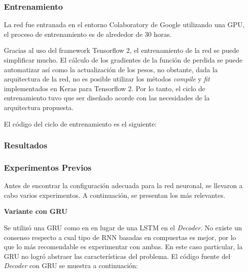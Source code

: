 



\subsubsection{Entrenamiento}

La red fue entranada en el entorno Colaboratory de Google utilizando una GPU, el proceso de entrenamiento es de alrededor de 30 horas.

Gracias al uso del framework Tensorflow 2, el entrenamiento de la red se puede simplificar mucho. El cálculo de los gradientes de la función de perdida se puede automatizar así como la actualización de los pesos, no obstante, dada la arquitectura de la red, no es posible utilizar los métodos \textit{compile} y \textit{fit} implementados en Keras para Tensorflow 2. Por lo tanto, el ciclo de entrenamiento tuvo que ser diseñado acorde con las necesidades de la arquitectura propuesta.

El código del ciclo de entrenamiento es el siguiente:



\subsubsection{Resultados}

\subsubsection{Experimentos Previos}

Antes de encontrar la configuración adecuada para la red neuronal, se llevaron a cabo varios experimentos. A continuación, se presentan los más relevantes.

\vspace{1em}
\textbf{Variante con GRU}
\vspace{1em}

Se utilizó una GRU como en \cite{gru} en lugar de una LSTM en el \textit{Decoder}. No existe un consenso respecto a cual tipo de RNN basadas en compuertas es mejor, por lo que lo más recomendable es experimentar con ambas. En este caso particular, la GRU no logró abstraer las características del problema. El código fuente del \textit{Decoder} con GRU se muestra a continuación:


